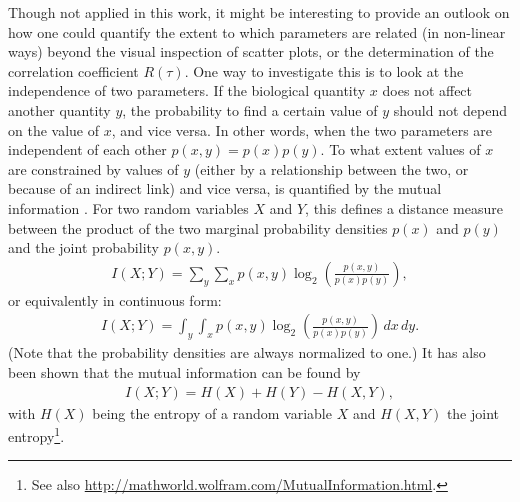 {Though not applied in this work, it might be interesting to provide an outlook on
how one could quantify the extent to which parameters are related (in non-linear ways) beyond the visual inspection of scatter plots, or the determination of the correlation coefficient $R(\tau)$.
%
One way to investigate this is to look at the independence of two parameters.
If the biological quantity $x$ does not affect another quantity $y$, 
the probability to find a certain value of $y$ should not depend on the value of $x$, and vice versa.
%
In other words, when the two parameters are independent of each other
$p(x,y)=p(x)p(y)$.
%
To what extent values of $x$ are constrained by values of $y$ (either by a relationship between the two, or because of an indirect link) and vice versa, is quantified by the mutual information \cite{Shannon1948, Bishop2006, WikipediaMutual2017}.
For two random variables $X$ and $Y$, this defines a distance measure between the product of the two marginal probability densities $p(x)$ and $p(y)$ and the joint probability $p(x,y)$.
%
\begin{align}
	I(X;Y) = 
	\sum_{y} { \sum_{x} { p(x,y) \log_2 \left( \frac{p(x,y)}{p(x)p(y)} \right) }},
\end{align}
or equivalently in continuous form:
\begin{align}
	I(X;Y) = 
	\int_{y} { \int_{x} { p(x,y) \log_2 \left( \frac{p(x,y)}{p(x)p(y)} \right) 
			\,dx\,dy}}
	.
\end{align}
(Note that the probability densities are always normalized to one.)
It has also been shown that the mutual information can be found by 
\begin{align}
	I(X;Y)=H(X)+H(Y)-H(X, Y)
	,
\end{align}
with $H(X)$ being the entropy of a random variable $X$ and $H(X,Y)$ the joint entropy\footnote{See also \url{http://mathworld.wolfram.com/MutualInformation.html}.}.
%
}
